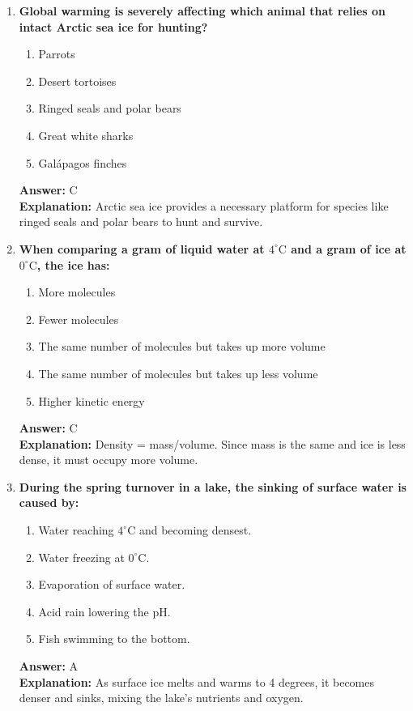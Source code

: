 \documentclass[11pt, a4paper]{article}
\begin{document}
\begin{enumerate}
\item \textbf{Global warming is severely affecting which animal that relies on intact Arctic sea ice for hunting?}
\begin{enumerate}[label=\Alph*.]
    \item Parrots
    \item Desert tortoises
    \item Ringed seals and polar bears
    \item Great white sharks
    \item Galápagos finches
\end{enumerate}
\textbf{Answer:} C \\
\textbf{Explanation:} Arctic sea ice provides a necessary platform for species like ringed seals and polar bears to hunt and survive.

\item \textbf{When comparing a gram of liquid water at $4^\circ\text{C}$ and a gram of ice at $0^\circ\text{C}$, the ice has:}
\begin{enumerate}[label=\Alph*.]
    \item More molecules
    \item Fewer molecules
    \item The same number of molecules but takes up more volume
    \item The same number of molecules but takes up less volume
    \item Higher kinetic energy
\end{enumerate}
\textbf{Answer:} C \\
\textbf{Explanation:} Density = mass/volume. Since mass is the same and ice is less dense, it must occupy more volume.

\item \textbf{During the spring turnover in a lake, the sinking of surface water is caused by:}
\begin{enumerate}[label=\Alph*.]
    \item Water reaching $4^\circ\text{C}$ and becoming densest.
    \item Water freezing at $0^\circ\text{C}$.
    \item Evaporation of surface water.
    \item Acid rain lowering the pH.
    \item Fish swimming to the bottom.
\end{enumerate}
\textbf{Answer:} A \\
\textbf{Explanation:} As surface ice melts and warms to 4 degrees, it becomes denser and sinks, mixing the lake's nutrients and oxygen.


\end{enumerate}
\end{document}
